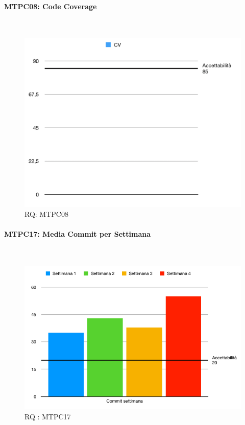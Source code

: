 \pagebreak

\paragraph{MTPC08: Code Coverage} \-\\
\begin{figure}[H]
	\begin{center}
		\includegraphics[scale=0.5]{./images/grafici_RQ/MTPC08.png}
	\end{center}
	\caption{RQ: MTPC08}
\end{figure}

\paragraph{MTPC17: Media Commit per Settimana}\-\\
\begin{figure}[H]
	\begin{center}
		\includegraphics[scale=0.5]{./images/grafici_RQ/commitSettimana.png} 
	\end{center}
	\caption{RQ : MTPC17}
\end{figure}

